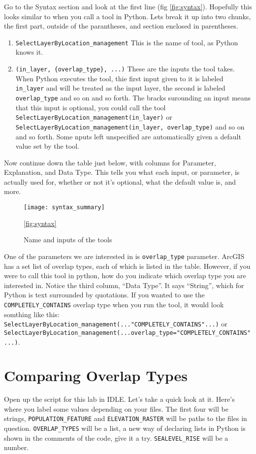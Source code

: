 \documentclass{article}
\begin{document}
\begin{enumerate}
{Go to the Syntax section and look at the first line (fig \ref{fig:syntax}).  Hopefully this looks similar to when you call a tool in Python.  Lets break it up into two chunks, the first part, outside of the parantheses, and section enclosed in parentheses.
\begin{enumerate}
    \item \verb+SelectLayerByLocation_management+ This is the name of tool, as Python knows it. 
    \item \verb+(in_layer, {overlap_type}, ...)+ These are the inputs the tool takes.  When Python executes the tool, thie first input given to it is labeled \verb+in_layer+ and will be treated as the input layer, the second is labeled \verb+overlap_type+ and so on and so forth.  The bracks surounding an input means that this input is optional, you could call the tool \verb+SelectLayerByLocation_management(in_layer)+ or \verb+SelectLayerByLocation_management(in_layer, overlap_type)+ and so on and so forth.  Some nputs left unspecified are automatically given a default value set by the tool.
\end{enumerate}

Now continue down the table just below, with columns for Parameter, Explanation, and Data Type.  This tells you what each input, or parameter,  is actually used for, whether or not it's optional, what the default value is, and more.

\begin{figure}
    \texttt{[image: syntax\_summary]}
    \caption{Name and inputs of the tools}
    \ref{fig:syntax}
\end{figure}

One of the parameters we are interested in is \verb+overlap_type+ parameter.  ArcGIS has a set list of overlap types, each of which is listed in the table.  However, if you were to call this tool in python, how do you indicate which overlap type you are interested in.  Notice the third column, ``Data Type''.  It says ``String'', which for Python is text surrounded by quotations.  If you wanted to use the \verb+COMPLETELY_CONTAINS+ overlap type when you run the tool, it would look somthing like this: \verb+SelectLayerByLocation_management(..."COMPLETELY_CONTAINS"...)+ or \verb+SelectLayerByLocation_management(...overlap_type="COMPLETELY_CONTAINS"...)+.

\section{Comparing Overlap Types}
Open up the script for this lab in IDLE.  Let's take a quick look at it.  Here's where you label some values depending on your files.  The first four will be strings, \verb+POPULATION_FEATURE+ and \verb+ELEVATION_RASTER+ will be paths to the files in question.  \verb+OVERLAP_TYPES+ will be a list, a new way of declaring lists in Python is shown in the comments of the code, give it a try.  \verb+SEALEVEL_RISE+ will be a number.

}
\end{enumerate}
\end{document}
